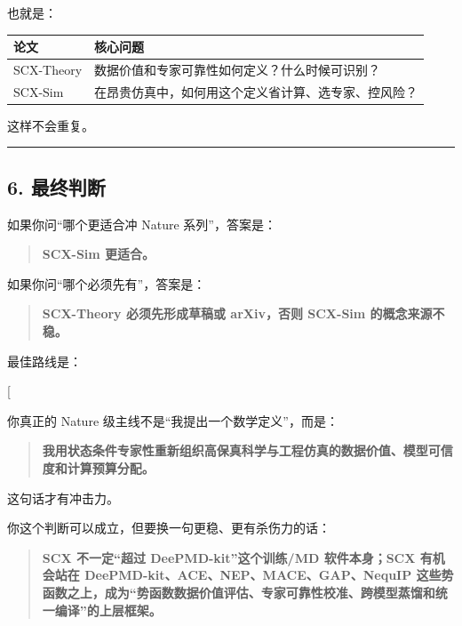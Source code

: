 \documentclass[
  12pt,
]{ctexart}
\begin{document}
也就是：

\begin{longtable}[]{@{}ll@{}}
\toprule\noalign{}
论文 & 核心问题 \\
\midrule\noalign{}
\endhead
\bottomrule\noalign{}
\endlastfoot
SCX-Theory & 数据价值和专家可靠性如何定义？什么时候可识别？ \\
SCX-Sim & 在昂贵仿真中，如何用这个定义省计算、选专家、控风险？ \\
\end{longtable}

这样不会重复。

\begin{center}\rule{0.5\linewidth}{0.5pt}\end{center}

\subsection{6. 最终判断}\label{ux6700ux7ec8ux5224ux65ad-13}

如果你问``哪个更适合冲 Nature 系列''，答案是：

\begin{quote}
\textbf{SCX-Sim 更适合。}
\end{quote}

如果你问``哪个必须先有''，答案是：

\begin{quote}
\textbf{SCX-Theory 必须先形成草稿或 arXiv，否则 SCX-Sim
的概念来源不稳。}
\end{quote}

最佳路线是：

{[}  \rightarrow {} \rightarrow
{} \rightarrow \text{SCX-Vision/Health}{]}

你真正的 Nature 级主线不是``我提出一个数学定义''，而是：

\begin{quote}
\textbf{我用状态条件专家性重新组织高保真科学与工程仿真的数据价值、模型可信度和计算预算分配。}
\end{quote}

这句话才有冲击力。

你这个判断可以成立，但要换一句更稳、更有杀伤力的话：

\begin{quote}
\textbf{SCX 不一定``超过 DeePMD-kit''这个训练/MD 软件本身；SCX
有机会站在 DeePMD-kit、ACE、NEP、MACE、GAP、NequIP
这些势函数之上，成为``势函数数据价值评估、专家可靠性校准、跨模型蒸馏和统一编译''的上层框架。}
\end{quote}
\end{document}
